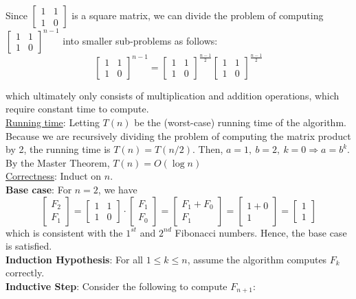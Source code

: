 \documentclass[twoside,11pt]{homework}
\begin{document}
\begin{enumerate}[\bf (a)]
\begin{enumerate}[i.)]
Since $ \begin{bmatrix}  1 & 1  \\  1 & 0  \end{bmatrix}$ is a square matrix, we can divide the problem of computing $\begin{bmatrix}  1 & 1  \\  1 & 0  \end{bmatrix}^{n-1}$ into smaller sub-problems as follows:
$$\begin{bmatrix}  1 & 1  \\  1 & 0  \end{bmatrix}^{n-1} = \begin{bmatrix}  1 & 1  \\  1 & 0  \end{bmatrix}^{\frac{n-1}{2}} \begin{bmatrix}  1 & 1  \\  1 & 0  \end{bmatrix}^{\frac{n-1}{2}}$$

which ultimately only consists of multiplication and addition operations, which require constant time to compute.  \\

\noindent
\underline{Running time}: Letting $T(n)$ be the (worst-case) running time of the algorithm.  Because we are recursively dividing the problem of computing the matrix product by 2, the running time is $T(n) = T(n/2)$.  Then, $a = 1, \ b = 2,  \ k = 0 \Longrightarrow a = b^k$.  \\[0.3em]
By the Master Theorem, $ T(n) = O(\log n)$ \\

\noindent
\underline{Correctness}:  Induct on $n$.\\[0.1em]
\textbf{Base case}:   For $n=2$, we have 
$$\begin{bmatrix}  F_{2}   \\  F_{1} \end{bmatrix} =  \begin{bmatrix}  1 & 1  \\  1 & 0  \end{bmatrix} \cdot \begin{bmatrix}  F_{1}   \\  F_{0} \end{bmatrix} = \begin{bmatrix} F_1 + F_0 \\ F_1 \end{bmatrix} = \begin{bmatrix} 1 + 0 \\ 1 \end{bmatrix} = \begin{bmatrix} 1 \\ 1 \end{bmatrix}$$
which is consistent with the $1^{st}$ and $2^{nd}$ Fibonacci numbers.  Hence, the base case is satisfied. \\[0.3em]
\textbf{Induction Hypothesis}:  For all $1 \leq k \leq n$, assume the algorithm computes $F_k$ correctly.  \\[0.3em]
\textbf{Inductive Step}: Consider the following to compute $F_{n+1}$:


\end{enumerate}
\end{enumerate}
\end{document}
